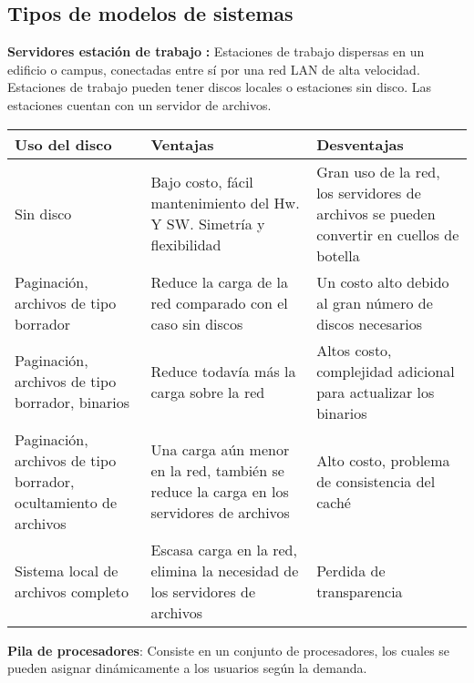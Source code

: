 \begin{center}
\subsection{Tipos de modelos de sistemas}
\end{center}

\textbullet{} \textbf{Servidores estación de trabajo }\textbf: Estaciones de trabajo dispersas en un edificio o campus, conectadas entre sí por una red LAN de alta velocidad. Estaciones de trabajo pueden tener discos locales o estaciones sin disco. Las estaciones cuentan con un servidor de archivos.

{\raggedright

\vspace{3pt} \noindent
\begin{tabular}{|p{120pt}|p{120pt}|p{141pt}|}
\hline
\parbox{120pt}{\centering 
\textbf{Uso del disco}
} & \parbox{120pt}{\centering 
\textbf{Ventajas}
} & \parbox{141pt}{\centering 
\textbf{Desventajas}
} \\
\hline
\parbox{120pt}{\centering 
{\small Sin disco}
} & \parbox{120pt}{\centering 
{\small Bajo costo, fácil mantenimiento del Hw. Y SW. Simetría y flexibilidad}
} & \parbox{141pt}{\centering 
{\small Gran uso de la red, los servidores de archivos se pueden convertir en cuellos de botella}
} \\
\hline
\parbox{120pt}{\centering 
{\small Paginación, archivos de tipo borrador}
} & \parbox{120pt}{\centering 
{\small Reduce la carga de la red comparado con el caso sin discos}
} & \parbox{141pt}{\centering 
{\small Un costo alto debido al gran número de discos necesarios}
} \\
\hline
\parbox{120pt}{\centering 
{\small Paginación, archivos de tipo borrador, binarios}
} & \parbox{120pt}{\centering 
{\small Reduce todavía más la carga sobre la red}
} & \parbox{141pt}{\centering 
{\small Altos costo, complejidad adicional para actualizar los binarios}
} \\
\hline
\parbox{120pt}{\centering 
{\small Paginación, archivos de tipo borrador, ocultamiento de archivos}
} & \parbox{120pt}{\centering 
{\small Una carga aún menor en la red, también se reduce la carga en los servidores de archivos}
} & \parbox{141pt}{\centering 
{\small Alto costo, problema de consistencia del caché}
} \\
\hline
\parbox{120pt}{\centering 
{\small Sistema local de archivos completo}
} & \parbox{120pt}{\centering 
{\small Escasa carga en la red, elimina la necesidad de los servidores de archivos}
} & \parbox{141pt}{\centering 
{\small Perdida de transparencia}
} \\
\hline
\end{tabular}
\vspace{2pt}

}
\vspace{1.5cm}
\textbullet{} \textbf{Pila de procesadores}: Consiste en un conjunto de procesadores, los cuales se pueden asignar dinámicamente a los usuarios según la demanda.

